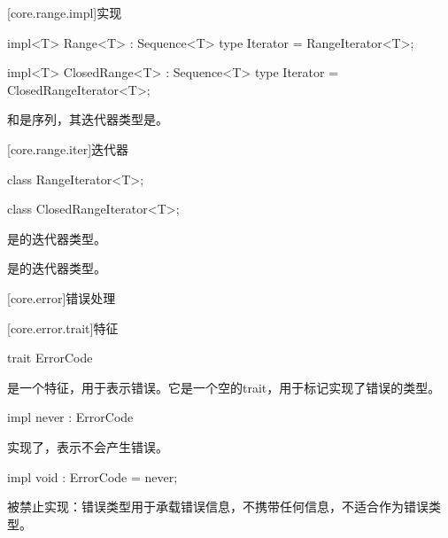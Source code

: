 [core.range.impl]{实现}

\begin{itemdecl}
impl<T> Range<T> : Sequence<T> {
    type Iterator = RangeIterator<T>;
}
\end{itemdecl}

\begin{itemdecl}
impl<T> ClosedRange<T> : Sequence<T> {
    type Iterator = ClosedRangeIterator<T>;
}
\end{itemdecl}

\pnum
{}和是序列，其迭代器类型是。

[core.range.iter]{迭代器}

\begin{itemdecl}
class RangeIterator<T>;
\end{itemdecl}

\begin{itemdecl}
class ClosedRangeIterator<T>;
\end{itemdecl}

\pnum
{}是的迭代器类型。

\pnum
{}是的迭代器类型。

[core.error]{错误处理}

[core.error.trait]{特征}

\begin{itemdecl}
trait ErrorCode { }
\end{itemdecl}

\pnum
{}是一个特征，用于表示错误。它是一个空的trait，用于标记实现了错误的类型。

\begin{itemdecl}
impl never : ErrorCode { }
\end{itemdecl}

\pnum
{}实现了，表示不会产生错误。

\begin{itemdecl}
impl void : ErrorCode = never;
\end{itemdecl}

\pnum
{}被禁止实现：错误类型用于承载错误信息，不携带任何信息，不适合作为错误类型。

